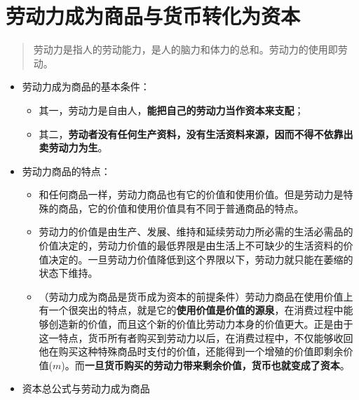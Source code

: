 \documentclass[
]{article}
\begin{document}
\hypertarget{ux52b3ux52a8ux529bux6210ux4e3aux5546ux54c1ux4e0eux8d27ux5e01ux8f6cux5316ux4e3aux8d44ux672c}{%
\section{劳动力成为商品与货币转化为资本}\label{ux52b3ux52a8ux529bux6210ux4e3aux5546ux54c1ux4e0eux8d27ux5e01ux8f6cux5316ux4e3aux8d44ux672c}}

\begin{quote}
劳动力是指人的劳动能力，是人的脑力和体力的总和。劳动力的使用即劳动。
\end{quote}

\begin{itemize}
\item
  劳动力成为商品的基本条件：

  \begin{itemize}
  \item
    其一，劳动力是自由人，\textbf{能把自己的劳动力当作资本来支配}；
  \item
    其二，\textbf{劳动者没有任何生产资料，没有生活资料来源，因而不得不依靠出卖劳动力为生}。
  \end{itemize}
\item
  劳动力商品的特点：

  \begin{itemize}
  \item
    和任何商品一样，劳动力商品也有它的价值和使用价值。但是劳动力是特殊的商品，它的价值和使用价值具有不同于普通商品的特点。
  \item
    劳动力的价值是由生产、发展、维持和延续劳动力所必需的生活必需品的价值决定的，劳动力价值的最低界限是由生活上不可缺少的生活资料的价值决定的。一旦劳动力价值降低到这个界限以下，劳动力就只能在萎缩的状态下维持。
  \item
    （劳动力成为商品是货币成为资本的前提条件）劳动力商品在使用价值上有一个很突出的特点，就是它的\textbf{使用价值是价值的源泉}，在消费过程中能够创造新的价值，而且这个新的价值比劳动力本身的价值更大。正是由于这一特点，货币所有者购买到劳动力以后，在消费过程中，不仅能够收回他在购买这种特殊商品时支付的价值，还能得到一个增殖的价值即剩余价值(\(m\))。而\textbf{一旦货币购买的劳动力带来剩余价值，货币也就变成了资本}。
  \end{itemize}
\item
  资本总公式与劳动力成为商品


\end{itemize}
\end{document}
